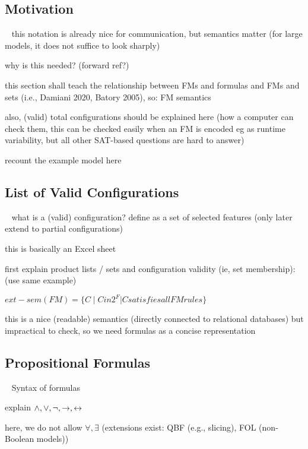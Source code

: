 \subsection{Motivation}

\begin{frame}{~}
    this notation is already nice for communication, but semantics matter (for large models, it does not suffice to look sharply)

    why is this needed? (forward ref?)

    this section shall teach the relationship between FMs and formulas and FMs and sets (i.e., Damiani 2020, Batory 2005), so: FM semantics

    also, (valid) total configurations should be explained here (how a computer can check them, this can be checked easily when an FM is encoded eg as runtime variability, but all other SAT-based questions are hard to answer)

    recount the example model here
\end{frame}

\subsection{List of Valid Configurations}

\begin{frame}{~}
    what is a (valid) configuration? define as a set of selected features (only later extend to partial configurations)

    this is basically an Excel sheet

    first explain product lists / sets and configuration validity (ie, set membership): (use same example)

    $ext-sem (FM) = \{ C \mid C in 2^F | C satisfies all FM rules \}$

    this is a nice (readable) semantics (directly connected to relational databases) but impractical to check, so we need formulas as a concise representation
\end{frame}

\subsection{Propositional Formulas}

\begin{frame}{~}
    Syntax of formulas

    explain $\wedge, \vee, \neg, \rightarrow, \leftrightarrow$

    here, we do not allow $\forall, \exists$ (extensions exist: QBF (e.g., slicing), FOL (non-Boolean models))
\end{frame}

